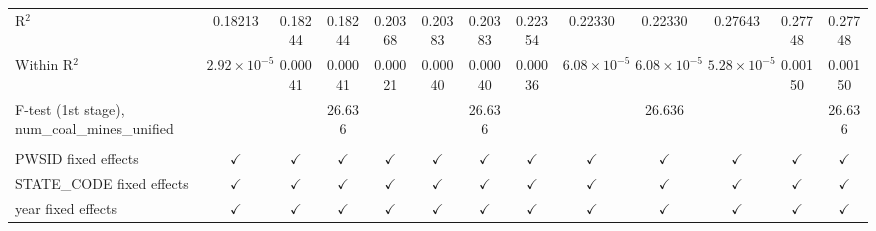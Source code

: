 \begin{table}[htbp]
\begin{adjustbox}{width = \textwidth, center}
\begin{tabular}{lcccccccccccc}
         R$^2$                                            & 0.18213               & 0.18244       & 0.18244       & 0.20368       & 0.20383       & 0.20383       & 0.22354       & 0.22330               & 0.22330               & 0.27643               & 0.27748       & 0.27748\\  
         Within R$^2$                                     & $2.92\times 10^{-5}$  & 0.00041       & 0.00041       & 0.00021       & 0.00040       & 0.00040       & 0.00036       & $6.08\times 10^{-5}$  & $6.08\times 10^{-5}$  & $5.28\times 10^{-5}$  & 0.00150       & 0.00150\\  
         F-test (1st stage), num\_coal\_mines\_unified    &                       &               & 26.636        &               &               & 26.636        &               &                       & 26.636                &                       &               & 26.636\\  
          \\
         PWSID fixed effects                              & $\checkmark$          & $\checkmark$  & $\checkmark$  & $\checkmark$  & $\checkmark$  & $\checkmark$  & $\checkmark$  & $\checkmark$          & $\checkmark$          & $\checkmark$          & $\checkmark$  & $\checkmark$\\   
         STATE\_CODE fixed effects                        & $\checkmark$          & $\checkmark$  & $\checkmark$  & $\checkmark$  & $\checkmark$  & $\checkmark$  & $\checkmark$  & $\checkmark$          & $\checkmark$          & $\checkmark$          & $\checkmark$  & $\checkmark$\\   
         year fixed effects                               & $\checkmark$          & $\checkmark$  & $\checkmark$  & $\checkmark$  & $\checkmark$  & $\checkmark$  & $\checkmark$  & $\checkmark$          & $\checkmark$          & $\checkmark$          & $\checkmark$  & $\checkmark$\\   
         \bottomrule
      \end{tabular}
   \end{adjustbox}
\end{table}


